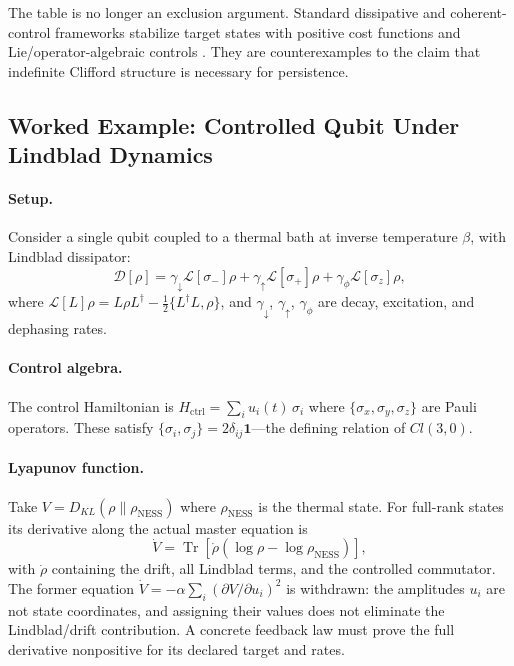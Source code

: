 \documentclass[aps,pre,onecolumn,superscriptaddress,floatfix,longbibliography]{revtex4-2}
\begin{document}
The table is no longer an exclusion argument.  Standard dissipative and coherent-control frameworks stabilize target states with positive cost functions and Lie/operator-algebraic controls \cite{Verstraete2009,Diehl2008,TicozziViola2008,Mirrahimi2005}.  They are counterexamples to the claim that indefinite Clifford structure is necessary for persistence.

\subsection{Worked Example: Controlled Qubit Under Lindblad Dynamics}
\label{sec:toymodel}

\paragraph{Setup.}
Consider a single qubit coupled to a thermal bath at inverse temperature $\beta$, with Lindblad dissipator:
\begin{equation}
\mathcal{D}[\rho] = \gamma_\downarrow \mathcal{L}[\sigma_-]\rho + \gamma_\uparrow \mathcal{L}[\sigma_+]\rho + \gamma_\phi \mathcal{L}[\sigma_z]\rho,
\end{equation}
where $\mathcal{L}[L]\rho = L\rho L^\dagger - \frac{1}{2}\{L^\dagger L, \rho\}$, and $\gamma_\downarrow$, $\gamma_\uparrow$, $\gamma_\phi$ are decay, excitation, and dephasing rates.

\paragraph{Control algebra.}
The control Hamiltonian is $H_{\mathrm{ctrl}} = \sum_i u_i(t)\, \sigma_i$ where $\{\sigma_x, \sigma_y, \sigma_z\}$ are Pauli operators.
These satisfy $\{\sigma_i, \sigma_j\} = 2\delta_{ij}\mathbf{1}$---the defining relation of $Cl(3,0)$.

\paragraph{Lyapunov function.}
Take $V = D_{KL}(\rho \| \rho_{\mathrm{NESS}})$ where $\rho_{\mathrm{NESS}}$ is the thermal state.
For full-rank states its derivative along the actual master equation is
\begin{equation}
\dot V
=\operatorname{Tr}\!\left[\dot\rho
(\log\rho-\log\rho_{\mathrm{NESS}})\right],
\end{equation}
with $\dot\rho$ containing the drift, all Lindblad terms, and the controlled commutator.  The former equation $\dot V=-\alpha\sum_i(\partial V/\partial u_i)^2$ is withdrawn: the amplitudes $u_i$ are not state coordinates, and assigning their values does not eliminate the Lindblad/drift contribution.  A concrete feedback law must prove the full derivative nonpositive for its declared target and rates.
\end{document}

